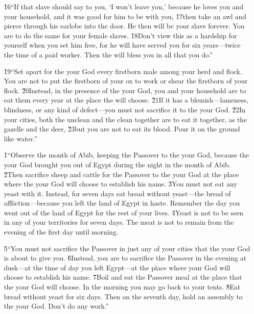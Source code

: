\v{16}``If that slave should say to you, `I won't leave you,' because he loves you and your household, and it was good for him to be with you, \v{17}then take an awl and pierce through his earlobe into the door. He then will be your slave forever. You are to do the same for your female slaves. \v{18}Don't view this as a hardship for yourself when you set him free, for he will have served you for six years---twice the time of a paid worker. Then the  will bless you in all that you do.''

\v{19}``Set apart for the  your God every firstborn male among your herd and flock. You are not to put the firstborn of your ox to work or shear the firstborn of your flock. \v{20}Instead, in the presence of the  your God, you and your household are to eat them every year at the place the  will choose. \v{21}If it has a blemish---lameness, blindness, or any kind of defect---you must not sacrifice it to the  your God. \v{22}In your cities, both the unclean and the clean together are to eat it together, as the gazelle and the deer, \v{23}but you are not to eat its blood. Pour it on the ground like water.''

\v{1}``Observe the month of Abib, keeping the Passover to the  your God, because the  your God brought you out of Egypt during the night in the month of Abib. \v{2}Then sacrifice sheep and cattle for the Passover to the  your God at the place where the  your God will choose to establish his name. \v{3}You must not eat any yeast with it. Instead, for seven days eat bread without yeast---the bread of affliction---because you left the land of Egypt in haste. Remember the day you went out of the land of Egypt for the rest of your lives. \v{4}Yeast is not to be seen in any of your territories for seven days. The meat is not to remain from the evening of the first day until morning.

\v{5}``You must not sacrifice the Passover in just any of your cities that the  your God is about to give you. \v{6}Instead, you are to sacrifice the Passover in the evening at dusk---at the time of day you left Egypt---at the place where your God will choose to establish his name. \v{7}Boil and eat the Passover meal at the place that the  your God will choose. In the morning you may go back to your tents. \v{8}Eat bread without yeast for six days. Then on the seventh day, hold an assembly to the  your God. Don't do any work.''

